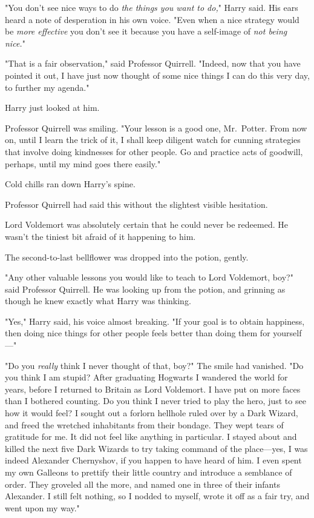 "You don't see nice ways to do \emph{the things you want to do,}" Harry said.
His ears heard a note of desperation in his own voice. "Even when a nice
strategy would be \emph{more effective} you don't see it because you have a
self-image of \emph{not being nice.}"

"That is a fair observation," said Professor Quirrell. "Indeed, now that you
have pointed it out, I have just now thought of some nice things I can do this
very day, to further my agenda."

Harry just looked at him.

Professor Quirrell was smiling. "Your lesson is a good one, Mr.~Potter. From
now on, until I learn the trick of it, I shall keep diligent watch for cunning
strategies that involve doing kindnesses for other people. Go and practice acts
of goodwill, perhaps, until my mind goes there easily."

Cold chills ran down Harry's spine.

Professor Quirrell had said this without the slightest visible hesitation.

Lord Voldemort was absolutely certain that he could never be redeemed. He
wasn't the tiniest bit afraid of it happening to him.

The second-to-last bellflower was dropped into the potion, gently.

"Any other valuable lessons you would like to teach to Lord Voldemort, boy?"
said Professor Quirrell. He was looking up from the potion, and grinning as
though he knew exactly what Harry was thinking.

"Yes," Harry said, his voice almost breaking. "If your goal is to obtain
happiness, then doing nice things for other people feels better than doing them
for yourself---"

"Do you \emph{really} think I never thought of that, boy?" The smile had
vanished. "Do you think I am stupid? After graduating Hogwarts I wandered the
world for years, before I returned to Britain as Lord Voldemort. I have put on
more faces than I bothered counting. Do you think I never tried to play the
hero, just to see how it would feel? I sought out a forlorn hellhole ruled over
by a Dark Wizard, and freed the wretched inhabitants from their bondage. They
wept tears of gratitude for me. It did not feel like anything in particular. I
stayed about and killed the next five Dark Wizards to try taking command of the
place---yes, I was indeed Alexander Chernyshov, if you happen to have heard of
him. I even spent my own Galleons to prettify their little country and
introduce a semblance of order. They groveled all the more, and named one in
three of their infants Alexander. I still felt nothing, so I nodded to myself,
wrote it off as a fair try, and went upon my way."

